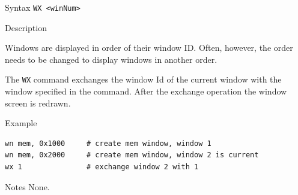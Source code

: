%
%
\pagebreak
{}

\begin{iPageDescEntry}{Syntax}
\texttt{WX <winNum>} \\
\end{iPageDescEntry}

\begin{iPageDescEntry}{Description}

Windows are displayed in order of their window ID. Often, however, the order needs to be changed to display windows in another order. 

The \texttt{WX} command exchanges the window Id of the current window with the window specified in the command. After the exchange operation the window screen is redrawn.

\end{iPageDescEntry}

\begin{iPageDescOpEntry}{Example}
\begin{lstlisting}[style=iPageOpStyle]
wn mem, 0x1000     # create mem window, window 1
wn mem, 0x2000     # create mem window, window 2 is current
wx 1               # exchange window 2 with 1
\end{lstlisting}
\end{iPageDescOpEntry}

\begin{iPageDescEntry}{Notes}
None.
\end{iPageDescEntry}
